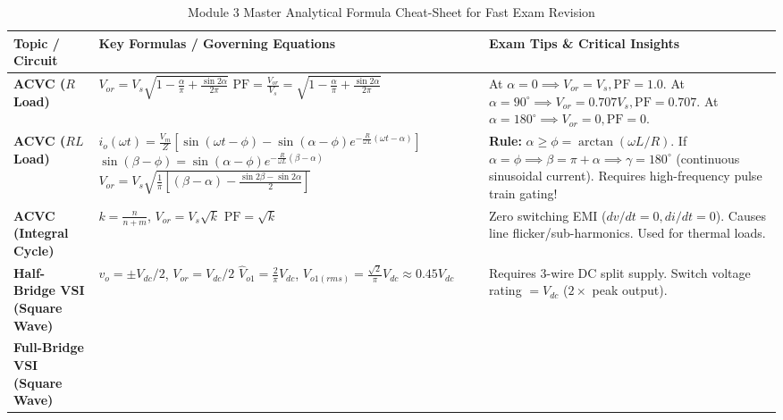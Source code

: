 \documentclass[11pt,a4paper]{article}
\begin{document}
\begin{table}[htbp]
\centering
\small
\caption{Module 3 Master Analytical Formula Cheat-Sheet for Fast Exam Revision}
\label{tab:module3_master_formulas}
\begin{tabularx}{\textwidth}{l p{5.5cm} X}
\toprule
\textbf{Topic / Circuit} & \textbf{Key Formulas / Governing Equations} & \textbf{Exam Tips \& Critical Insights} \\
\midrule
\textbf{ACVC ($R$ Load)} &
$V_{or} = V_s \sqrt{1 - \frac{\alpha}{\pi} + \frac{\sin 2\alpha}{2\pi}}$ \newline
$\text{PF} = \frac{V_{or}}{V_s} = \sqrt{1 - \frac{\alpha}{\pi} + \frac{\sin 2\alpha}{2\pi}}$ &
At $\alpha=0 \implies V_{or}=V_s, \text{PF}=1.0$. \newline
At $\alpha=90^\circ \implies V_{or}=0.707 V_s, \text{PF}=0.707$. \newline
At $\alpha=180^\circ \implies V_{or}=0, \text{PF}=0$. \\
\midrule
\textbf{ACVC ($RL$ Load)} &
$i_o(\omega t) = \frac{V_m}{Z}[\sin(\omega t-\phi) - \sin(\alpha-\phi)e^{-\frac{R}{\omega L}(\omega t-\alpha)}]$ \newline
$\sin(\beta-\phi) = \sin(\alpha-\phi)e^{-\frac{R}{\omega L}(\beta-\alpha)}$ \newline
$V_{or} = V_s \sqrt{\frac{1}{\pi}[(\beta-\alpha) - \frac{\sin 2\beta - \sin 2\alpha}{2}]}$ &
\textbf{Rule:} $\alpha \ge \phi = \arctan(\omega L / R)$. \newline
If $\alpha = \phi \implies \beta = \pi + \alpha \implies \gamma = 180^\circ$ (continuous sinusoidal current). \newline
Requires high-frequency pulse train gating! \\
\midrule
\textbf{ACVC (Integral Cycle)} &
$k = \frac{n}{n+m}$, \quad $V_{or} = V_s \sqrt{k}$ \newline
$\text{PF} = \sqrt{k}$ &
Zero switching EMI ($dv/dt=0, di/dt=0$). \newline
Causes line flicker/sub-harmonics. Used for thermal loads. \\
\midrule
\textbf{Half-Bridge VSI (Square Wave)} &
$v_o = \pm V_{dc}/2$, \quad $V_{or} = V_{dc}/2$ \newline
$\hat{V}_{o1} = \frac{2}{\pi}V_{dc}$, \quad $V_{o1(rms)} = \frac{\sqrt{2}}{\pi}V_{dc} \approx 0.45 V_{dc}$ &
Requires 3-wire DC split supply. \newline
Switch voltage rating $= V_{dc}$ ($2 \times$ peak output). \\
\midrule
\textbf{Full-Bridge VSI (Square Wave)} &

\end{tabularx}
\end{table}
\end{document}

